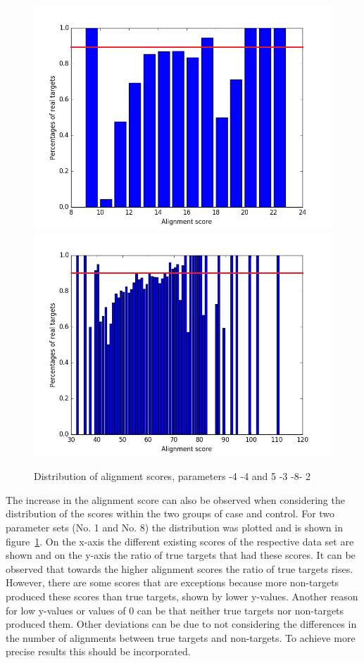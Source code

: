 \documentclass[11pt, a4paper, twoside]{book}
\begin{document}
\begin{figure}
\centering
\includegraphics[scale=0.28]{results/plot_scores-4-4_thresh.png}
\includegraphics[scale=0.28]{results/plot_scores5-3-8-2_thresh.png}
\caption{Distribution of alignment scores, parameters -4 -4 and 5 -3 -8- 2}
\label{fig:distribution}
\end{figure}

The increase in the alignment score can also be observed when considering the distribution of the scores within the two groups of case and control. For two parameter sets (No. 1 and No. 8) the distribution was plotted and is shown in figure~\ref{fig:distribution}. On the x-axis the different existing scores of the respective data set are shown and on the y-axis the ratio of true targets that had these scores. It can be observed that towards the higher alignment scores the ratio of true targets rises. However, there are some scores that are exceptions because more non-targets produced these scores than true targets, shown by lower y-values. Another reason for low y-values or values of 0 can be that neither true targets nor non-targets produced them. Other deviations can be due to not considering the differences in the number of alignments between true targets and non-targets. To achieve more precise results this should be incorporated. 
\end{document}
